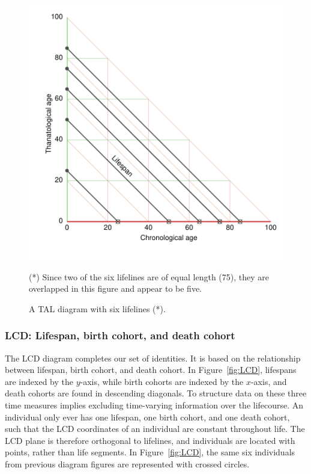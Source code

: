 \documentclass[12pt,oneside,a4paper]{article} %
\newcommand\tgh[1]{\raisebox{-.25\height}{\texttt{[image: Figures/triadtable/triad\#1.pdf]}}}
\begin{document}
\begin{figure}[h!] 
\caption{A TAL diagram with six lifelines (*).}
\label{fig:TAL}
\centering
\includegraphics[scale=0.7]{Figures/TALrt.pdf}

\bigskip
\raggedright
(*) Since two of the six lifelines are of equal length (75), they are
overlapped in this figure and appear to be five.
\end{figure} 


\FloatBarrier
\subsubsection{LCD: Lifespan, birth cohort, and death cohort}%
\FloatBarrier

The LCD diagram completes our set of identities. It is based on the relationship
between lifespan, birth cohort, and death cohort. In
Figure~\ref{fig:LCD}, lifespans are indexed by the $y$-axis, while birth cohorts are indexed by the $x$-axis, and death cohorts
are found in descending diagonals. To structure data on these three
time measures implies excluding time-varying information over the lifecourse.
An individual
only ever has one lifespan, one birth cohort, and one death cohort, such that
the LCD coordinates of an individual are constant throughout life.
The LCD plane is therefore orthogonal to lifelines, and individuals are located
with points, rather than life segments.
In Figure~\ref{fig:LCD}, the same six individuals from previous diagram figures are represented with crossed circles.
\end{document}
